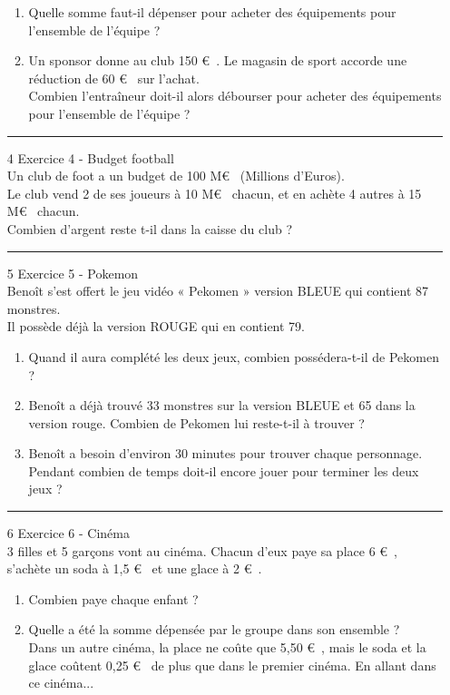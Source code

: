 \documentclass[11pt]{article}
\begin{document}
\begin{multicols}{2}
\begin{enumerate}
\begin{enumerate}
  \item Quelle somme faut-il dépenser pour acheter des équipements pour l’ensemble de l’équipe ?
  \item Un sponsor donne au club 150 \euro~. Le magasin de sport accorde une réduction de 60 \euro~ sur l’achat. \\
 Combien l’entraîneur doit-il alors débourser pour acheter des équipements pour l’ensemble de l’équipe ?
  \end{enumerate}
\rule{\linewidth}{0.5pt}
\item[4] Exercice 4 - Budget football\\
  Un club de foot a un budget de 100 M\euro~ (Millions d’Euros).\\
  Le club vend 2 de ses joueurs à 10 M\euro~ chacun, et en achète 4 autres à 15 M\euro~ chacun.\\
  Combien d’argent reste t-il dans la caisse du club ?\\
\rule{\linewidth}{0.5pt}
\item[5] Exercice 5 - Pokemon\\
  Benoît s’est offert le jeu vidéo « Pekomen » version BLEUE qui contient 87 monstres.\\
  Il possède déjà la version ROUGE qui en contient 79.
 \begin{enumerate}
  \item Quand il aura complété les deux jeux, combien possédera-t-il de Pekomen ?
  \item Benoît a déjà trouvé 33 monstres sur la version BLEUE et 65 dans la version rouge.
Combien de Pekomen lui reste-t-il à trouver ?
  \item Benoît a besoin d’environ 30 minutes pour trouver chaque personnage. \\
Pendant combien de temps doit-il encore jouer pour terminer les deux jeux ?
  \end{enumerate}
\rule{\linewidth}{0.5pt}
\item[6] Exercice 6 - Cinéma\\
  3 filles et 5 garçons vont au cinéma. Chacun d’eux paye sa place 6 \euro~, s’achète un soda à 1,5 \euro~ et une glace à 2 \euro~.
  \begin{enumerate}
  \item Combien paye chaque enfant ?
  \item Quelle a été la somme dépensée par le groupe dans son ensemble ?\\
    Dans un autre cinéma, la place ne coûte que 5,50 \euro~, mais le soda et la glace coûtent 0,25 \euro~ de plus que dans le premier cinéma. En allant dans ce cinéma...

\end{enumerate}
\end{enumerate}
\end{multicols}
\end{document}
